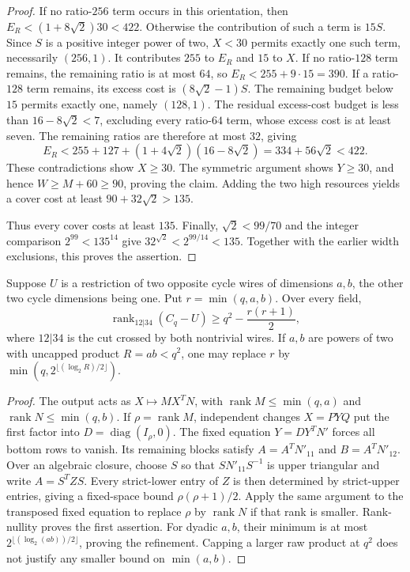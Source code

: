 \begin{proof}
If no ratio-$256$ term occurs in this orientation, then
$E_R<(1+8\sqrt2)30<422$. Otherwise the contribution of such a
term is $15S$. Since $S$ is a positive integer power of two,
$X<30$ permits exactly one such term, necessarily $(256,1)$.
It contributes $255$ to $E_R$ and $15$ to $X$.
If no ratio-$128$ term remains, the remaining ratio is at most
$64$, so $E_R<255+9\cdot15=390$. If a ratio-$128$ term
remains, its excess cost is $(8\sqrt2-1)S$. The remaining budget
below $15$ permits exactly one, namely $(128,1)$. The residual
excess-cost budget is less than $16-8\sqrt2<7$, excluding every
ratio-$64$ term, whose excess cost is at least seven.
The remaining ratios are therefore at most $32$, giving
\[
 E_R<255+127+(1+4\sqrt2)(16-8\sqrt2)
     =334+56\sqrt2<422.
\]
These contradictions show $X\geq30$. The symmetric argument
shows $Y\geq30$, and hence $W\geq M+60\geq90$, proving the
claim. Adding the two high resources yields a cover cost at least
$90+32\sqrt2>135$.

Thus every cover costs at least $135$. Finally,
$\sqrt2<99/70$ and the integer comparison $2^{99}<135^{14}$
give $32^{\sqrt2}<2^{99/14}<135$. Together with the earlier
width exclusions, this proves the assertion.
\end{proof}

\begin{lemma}
\label{pg:crosscut-resource}
Suppose $U$ is a restriction of two opposite cycle wires of
dimensions $a,b$, the other two cycle dimensions being one.
Put $r=\min(q,a,b)$. Over every field,
\[
 \operatorname{rank}_{12|34}(C_q-U)
 \geq q^2-\frac{r(r+1)}2,
\]
where $12|34$ is the cut crossed by both nontrivial wires.
If $a,b$ are powers of two with uncapped product $R=ab<q^2$,
one may replace $r$ by
$\min(q,2^{\lfloor(\log_2R)/2\rfloor})$.
\end{lemma}
\begin{proof}
The output acts as $X\mapsto MX^TN$, with
$\operatorname{rank}M\leq\min(q,a)$ and
$\operatorname{rank}N\leq\min(q,b)$. If $\rho=\operatorname{rank}M$,
independent changes $X=P Y Q$ put the first factor into
$D=\operatorname{diag}(I_\rho,0)$. The fixed equation
$Y=DY^TN'$ forces all bottom rows to vanish. Its remaining blocks
satisfy $A=A^TN'_{11}$ and $B=A^TN'_{12}$. Over an algebraic
closure, choose $S$ so that $S N'_{11}S^{-1}$ is upper triangular
and write $A=S^T ZS$. Every strict-lower entry of $Z$ is then
determined by strict-upper entries, giving a fixed-space bound
$\rho(\rho+1)/2$. Apply the same argument to the transposed
fixed equation to replace $\rho$ by $\operatorname{rank}N$ if
that rank is smaller. Rank-nullity proves the first assertion.
For dyadic $a,b$, their minimum is at most
$2^{\lfloor(\log_2(ab))/2\rfloor}$, proving the refinement.
Capping a larger raw product at $q^2$ does not justify any smaller
bound on $\min(a,b)$.
\end{proof}

